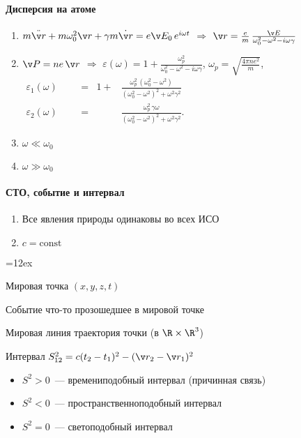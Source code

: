 \documentclass[draft]{trchesh}
\newcommand{\deflabel}[1]{
  \makebox[\labelwidth][l]{%
    \parbox[t]{\labelwidth}{\hspace{0pt}\textsf{#1}}%
  }~::
}
\newenvironment{defs}%
  {\begin{list}{}{%
        \let \makelabel=\deflabel%
        \labelwidth=12ex %
        \setlength{\leftmargin}{\labelwidth+\labelsep}%
        \itemsep=0pt %
      }}%
  {\end{list}}
\begin{document}
\begin{multicols*}{3}
\paragraph{Дисперсия на атоме}
\begin{enumerate}
  \item $m\ddot{\v r} + m \omega_0^2 \v r + \gamma m \dot{\v r} = e \v E_0 \, e^{i \omega t}$
    $ \Rightarrow$ $\v r = \frac em \, \frac{\v E}{\omega_0^2 - \omega^2 - i \omega \gamma} $
  \item $\v P = n e\, \v r$ $ \Rightarrow$ $\varepsilon(\omega) 
    = 1 + \frac{\omega_p^2}{\omega_0^2 - \omega^2 - i \omega \gamma}$, 
    $\omega_p = \textstyle\sqrt{\frac{4 \pi n e^2}{m}}$, \\
    $
    \begin{aligned}
      \varepsilon_1(\omega)& &&=& 1 + 
      &\frac{\omega_p^2 \, (\omega_0^2 - \omega^2)}{(\omega_0^2 - \omega^2)^2 + \omega^2 \gamma^2} \\
      \varepsilon_2(\omega)& &&=& 
      &\frac{\omega_p^2 \, \gamma \omega}{(\omega_0^2 - \omega^2)^2 + \omega^2 \gamma^2}.
    \end{aligned}
    $
  \item $\omega \ll \omega_0$
  \item $\omega \gg \omega_0$
\end{enumerate}

\paragraph{СТО, событие и интервал}
\begin{enumerate}
  \item Все явления природы одинаковы во всех ИСО
  \item $c=\textrm{const}$
\end{enumerate}

\begin{defs}
  \item[Мировая точка] $(x,y,z,t)$
  \item[Событие] что-то прозошедшее в мировой точке
  \item[Мировая линия] траектория точки (в $\R \times \R^3$)
  \item[Интервал] $S_{12}^2 = c(t_2 - t_1)^2 - (\v r_2 - \v r_1)^2$
\end{defs}
\begin{itemize}
  \item $S^2 > 0$~--- времениподобный интервал (причинная связь)
  \item $S^2 < 0$~--- пространственноподобный интервал 
  \item $S^2 = 0$~--- светоподобный интервал
\end{itemize}


\end{multicols*}
\end{document}
